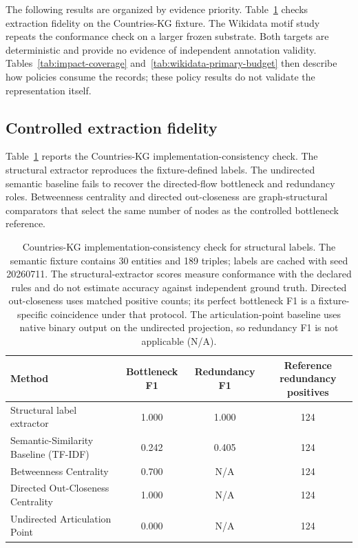 \documentclass[pdflatex,sn-basic]{sn-jnl}
\begin{document}
The following results are organized by evidence priority. Table~\ref{tab:kg-label-validation} checks extraction fidelity on the Countries-KG fixture. The Wikidata motif study repeats the conformance check on a larger frozen substrate. Both targets are deterministic and provide no evidence of independent annotation validity. Tables~\ref{tab:impact-coverage} and~\ref{tab:wikidata-primary-budget} then describe how policies consume the records; these policy results do not validate the representation itself.

\subsection{Controlled extraction fidelity}

Table~\ref{tab:kg-label-validation} reports the Countries-KG implementation-consistency check. The structural extractor reproduces the fixture-defined labels. The undirected semantic baseline fails to recover the directed-flow bottleneck and redundancy roles. Betweenness centrality and directed out-closeness are graph-structural comparators that select the same number of nodes as the controlled bottleneck reference.

\begin{table}[t]
\caption{Countries-KG implementation-consistency check for structural labels. The semantic fixture contains 30 entities and 189 triples; labels are cached with seed 20260711. The structural-extractor scores measure conformance with the declared rules and do not estimate accuracy against independent ground truth. Directed out-closeness uses matched positive counts; its perfect bottleneck F1 is a fixture-specific coincidence under that protocol. The articulation-point baseline uses native binary output on the undirected projection, so redundancy F1 is not applicable (N/A).}
\label{tab:kg-label-validation}
\centering
\small
\begin{tabular}{lccc}
\toprule
Method & Bottleneck F1 & Redundancy F1 & \makecell{Reference redundancy\\positives} \\
\midrule
Structural label extractor & 1.000 & 1.000 & 124 \\
Semantic-Similarity Baseline (TF-IDF) & 0.242 & 0.405 & 124 \\
Betweenness Centrality & 0.700 & N/A & 124 \\
Directed Out-Closeness Centrality & 1.000 & N/A & 124 \\
Undirected Articulation Point & 0.000 & N/A & 124 \\
\bottomrule
\end{tabular}
\end{table}
\end{document}
